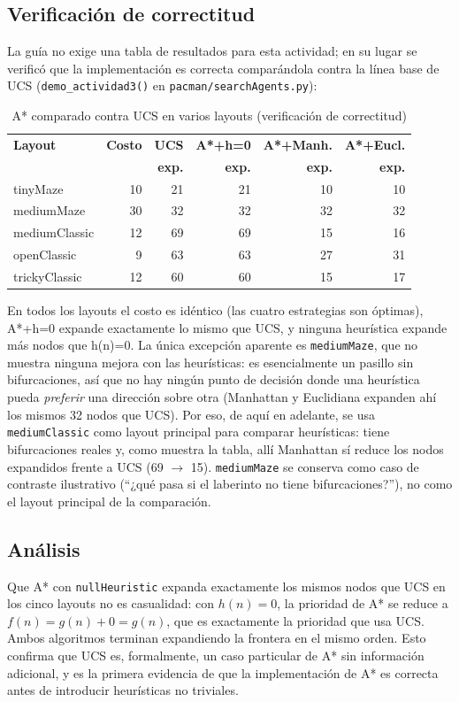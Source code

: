 \subsection{Verificación de correctitud}

La guía no exige una tabla de resultados para esta actividad; en su lugar se verificó que la
implementación es correcta comparándola contra la línea base de UCS
(\texttt{demo\_actividad3()} en \texttt{pacman/searchAgents.py}):

\begin{table}[H]
\centering
\caption{A* comparado contra UCS en varios layouts (verificación de correctitud)}
\label{tab:act3-verificacion}
\small
\begin{tabular}{lrrrrr}
\toprule
\textbf{Layout} & \textbf{Costo} & \textbf{UCS} & \textbf{A*+h=0} & \textbf{A*+Manh.} & \textbf{A*+Eucl.} \\
 & & \textbf{exp.} & \textbf{exp.} & \textbf{exp.} & \textbf{exp.} \\
\midrule
tinyMaze       & 10 & 21 & 21 & 10 & 10 \\
mediumMaze     & 30 & 32 & 32 & 32 & 32 \\
mediumClassic  & 12 & 69 & 69 & 15 & 16 \\
openClassic    &  9 & 63 & 63 & 27 & 31 \\
trickyClassic  & 12 & 60 & 60 & 15 & 17 \\
\bottomrule
\end{tabular}
\end{table}

En todos los layouts el costo es idéntico (las cuatro estrategias son óptimas), A*+h=0 expande
exactamente lo mismo que UCS, y ninguna heurística expande más nodos que h(n)=0. La única
excepción aparente es \texttt{mediumMaze}, que no muestra ninguna mejora con las heurísticas: es
esencialmente un pasillo sin bifurcaciones, así que no hay ningún punto de decisión donde una
heurística pueda \emph{preferir} una dirección sobre otra (Manhattan y Euclidiana expanden ahí los
mismos 32 nodos que UCS). Por eso, de aquí en adelante, se usa \texttt{mediumClassic} como layout
principal para comparar heurísticas: tiene bifurcaciones reales y, como muestra la tabla, allí
Manhattan sí reduce los nodos expandidos frente a UCS (69 $\rightarrow$ 15).
\texttt{mediumMaze} se conserva como caso de contraste ilustrativo (``¿qué pasa si el laberinto no
tiene bifurcaciones?''), no como el layout principal de la comparación.

\subsection{Análisis}

Que A* con \texttt{nullHeuristic} expanda exactamente los mismos nodos que UCS en los cinco
layouts no es casualidad: con $h(n) = 0$, la prioridad de A* se reduce a $f(n) = g(n) + 0 = g(n)$,
que es exactamente la prioridad que usa UCS. Ambos algoritmos terminan expandiendo la frontera en
el mismo orden. Esto confirma que UCS es, formalmente, un caso particular de A* sin información
adicional, y es la primera evidencia de que la implementación de A* es correcta antes de
introducir heurísticas no triviales.
